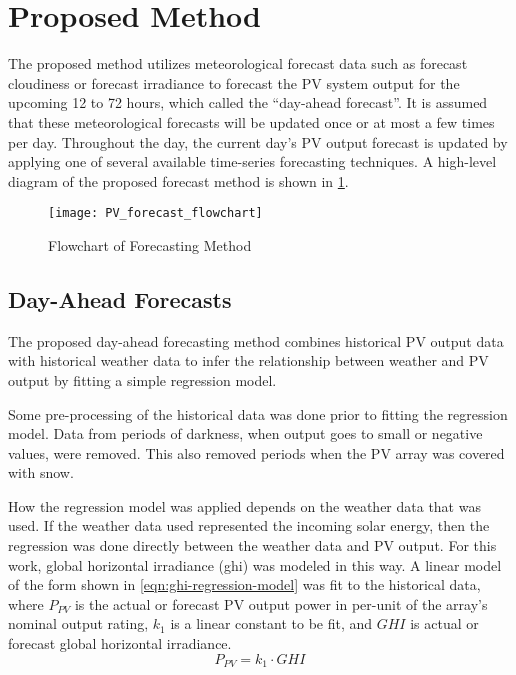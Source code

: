 \section{Proposed Method}
\label{sec:proposed-method}

The proposed method utilizes meteorological forecast data such as forecast cloudiness or forecast irradiance to forecast the PV system output for the upcoming 12 to 72 hours, which called the ``day-ahead forecast''.
It is assumed that these meteorological forecasts will be updated once or at most a few times per day.
Throughout the day, the current day's PV output forecast is updated by applying one of several available time-series forecasting techniques.
A high-level diagram of the proposed forecast method is shown in \cref{fig:PV_forecast_flowchart}.

\begin{figure}[ht]
	\centering
	\texttt{[image: PV\_forecast\_flowchart]}
	\caption{Flowchart of Forecasting Method}
	\label{fig:PV_forecast_flowchart}
\end{figure}


\subsection{Day-Ahead Forecasts}
\label{sec:method-day-ahead}

The proposed day-ahead forecasting method combines historical PV output data with historical weather data to infer the relationship between weather and PV output by fitting a simple regression model.

Some pre-processing of the historical data was done prior to  fitting the regression model.
Data from periods of darkness, when output goes to small or negative values, were removed.
This also removed periods when the PV array was covered with snow.

How the regression model was applied depends on the weather data that was used.
If the weather data used represented the incoming solar energy, then the regression was done directly between the weather data and PV output.
For this work, global horizontal irradiance (ghi) was modeled in this way.
A linear model of the form shown in \cref{eqn:ghi-regression-model} was fit to the historical data, where
$P_{PV}$ is the actual or forecast PV output power in per-unit of the array's nominal output rating,
$k_1$ is a linear constant to be fit, and
$GHI$ is actual or forecast global horizontal irradiance.
%
\begin{equation}
	\label{eqn:ghi-regression-model}
	P_{PV} = k_1 \cdot GHI
\end{equation}

